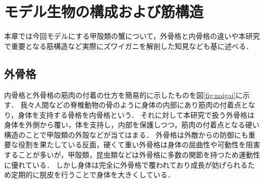\newpage
\section{モデル生物の構成および筋構造}
本章では今回モデルにする甲殻類の蟹について，外骨格と内骨格の違いや本研究で重要となる筋構造など実際にズワイガニを解剖した知見なども基に述べる．
\subsection{外骨格}
内骨格と外骨格の筋肉の付着の仕方を簡易的に示したものを図\ref{fig:naigai}に示す．
我々人間などの脊椎動物の骨のように身体の内部にあり筋肉の付着点となり，身体を支持する骨格を内骨格という．
それに対して本研究で扱う外骨格は身体を外側から覆い，体を支持し，内部を保護しつつ，筋肉の付着点となる硬い構造のことで甲殻類の外殻などが当てはまる．
外骨格は外敵からの防御にも重要な役割を果たしている反面，硬くて重い外骨格は身体の屈曲性や可動性を阻害することが多いが，甲殻類，昆虫類などは外骨格に多数の関節を持つため運動性に優れている．
しかし身体は完全に外骨格で覆われており成長が妨げられるため定期的に脱皮を行うことで身体を大きくしている．
